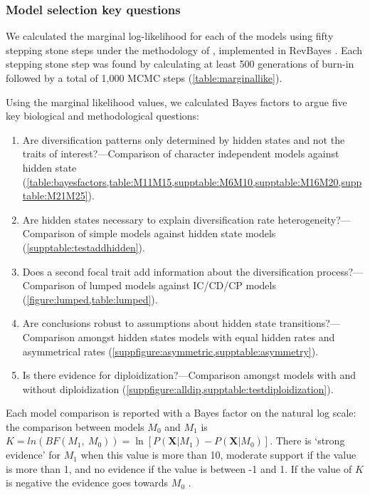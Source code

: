 \subsubsection{Model selection key questions}

We calculated the marginal log-likelihood for each of the models using fifty stepping stone steps under the methodology of \citet{xie_2010}, implemented in RevBayes \citep{hoehna_2016}.
Each stepping stone step was found by calculating at least 500 generations of burn-in followed by a total of 1,000 MCMC steps (\cref{table:marginallike}).

Using the marginal likelihood values, we calculated Bayes factors to argue five key biological and methodological questions:
\begin{enumerate}
\item Are diversification patterns only determined by hidden states and not the traits of interest?---Comparison of character independent models against hidden state (\cref{table:bayesfactors,table:M11M15,supptable:M6M10,supptable:M16M20,supptable:M21M25}).
\item Are hidden states necessary to explain diversification rate heterogeneity?---Comparison of simple models against hidden state models (\cref{supptable:testaddhidden}).
\item Does a second focal trait add information about the diversification process?---Comparison of lumped models against IC/CD/CP models (\cref{figure:lumped,table:lumped}).
\item Are conclusions robust to assumptions about hidden state transitions?---Comparison amongst hidden states models with equal hidden rates and asymmetrical rates (\cref{suppfigure:asymmetric,supptable:asymmetry}).
\item Is there evidence for diploidization?---Comparison amongst models with and without diploidization (\cref{suppfigure:alldip,supptable:testdiploidization}).
\end{enumerate}

Each model comparison is reported with a Bayes factor on the natural log scale: the comparison between models $M_0$ and $M_1$ is $K=ln(BF(M_1,\ M_0)) = \ln[ P(\mathbf{X} | M_1) - P(\mathbf{X} | M_0)]$.
There is `strong evidence' for $M_1$ when this value is more than 10, moderate support if the value is more than 1, and no evidence if the value is between -1 and 1.
If the value of $K$ is negative the evidence goes towards $M_0$ \citep{kass1995}.

